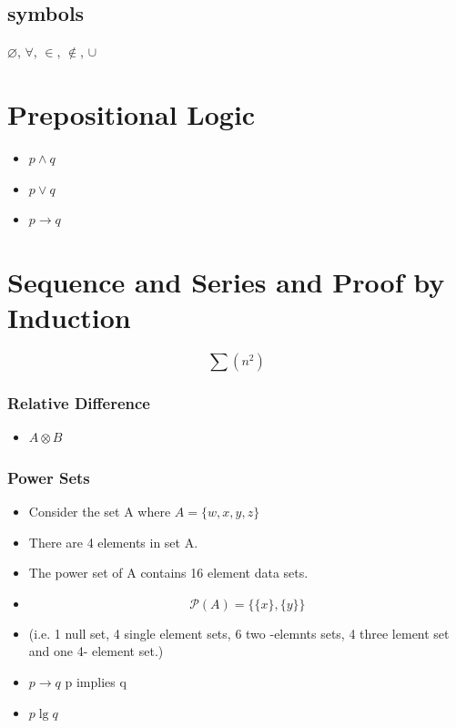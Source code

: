 \documentclass{article}
\begin{document}
\subsection*{symbols}
$\varnothing$,
$\forall$,
$\in$,
$\notin$,
$\cup$
\newpage

\section*{Prepositional Logic}


\begin{itemize}
	\item $p \wedge q$
	\item $p \vee q$
	\item $p \rightarrow q$
\end{itemize}
\newpage
\section{Sequence and Series and Proof by Induction}


\[\sum (n^2) \]

\subsubsection*{Relative Difference}
\begin{itemize}
	\item $ A \otimes B$
\end{itemize}
\subsubsection*{Power Sets}
\begin{itemize}
	\item Consider the set A where $ A = \{w,x,y,z\}$
	\item There are 4 elements in set A.
	\item The power set of A contains 16 element data sets.
	\item \[  \mathcal{P}(A) = \{\{ x \}, \{ y \} \}  \]
	\item (i.e. 1 null set, 4 single element sets, 6 two -elemnts sets, 4 three lement set and one 4- element set.)
\end{itemize}
\newpage
\begin{itemize}
	\item $ p \rightarrow q$  p implies q
	\item $p \lg q $
\end{itemize}
\newpage
\end{document}
